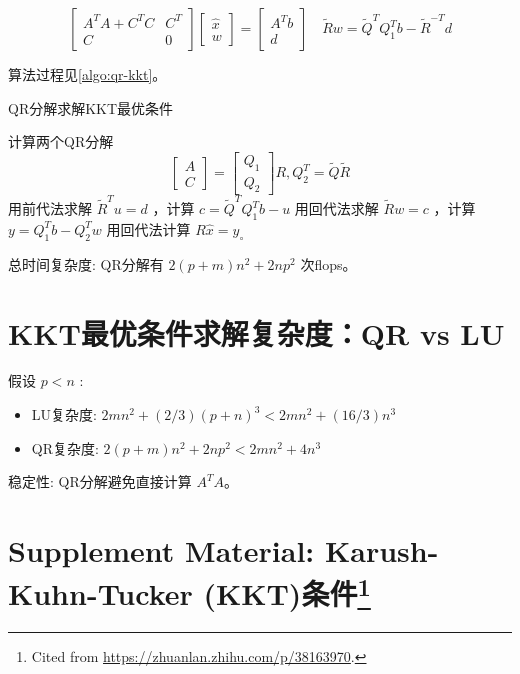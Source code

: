 $$ \left[\begin{array}{cc}A^{T} A+C^{T} C & C^{T} \\ C & 0\end{array}\right]\left[\begin{array}{c}\hat{x} \\ w\end{array}\right]=\left[\begin{array}{c}A^{T} b \\ d\end{array}\right] \quad \tilde{R} w=\tilde{Q}^{T} Q_{1}^{T} b-\tilde{R}^{-T} d $$

算法过程见\ref{algo:qr-kkt}。

\begin{algorithm}[htbp]
    \caption{QR分解求解KKT最优条件}
    \label{algo:qr-kkt}
    计算两个QR分解
$$
\left[\begin{array}{l}
A\\
C
\end{array}\right]=\left[\begin{array}{l}
Q_{1} \\
Q_{2}
\end{array}\right] R, Q_{2}^{T}=\tilde{Q} \tilde{R}
$$\;
用前代法求解 $ \tilde{R}^{T} u=d $ ，计算 $ c=\tilde{Q}^{T} Q_{1}^{T} b-u $\;
用回代法求解 $ \tilde{R} w=c $ ，计算 $ y=Q_{1}^{T} b-Q_{2}^{T} w $\;
用回代法计算 $ R \hat{x}=y_{\circ} $\;

\end{algorithm}

总时间复杂度: QR分解有 $ 2(p+m) n^{2}+2 n p^{2} $ 次flops。


\section{KKT最优条件求解复杂度：QR vs LU}

假设 $ p<n $ :

\begin{itemize}
    \item LU复杂度: $ 2 m n^{2}+(2 / 3)(p+n)^{3}<2 m n^{2}+(16 / 3) n^{3} $
    \item QR复杂度: $ 2(p+m) n^{2}+2 n p^{2}<2 m n^{2}+4 n^{3} $
\end{itemize}

稳定性: QR分解避免直接计算 $ A^{T} {A}$。

\section[Supplement Material: Karush-Kuhn-Tucker (KKT)条件]{Supplement Material: Karush-Kuhn-Tucker (KKT)条件\footnote{Cited from \url{https://zhuanlan.zhihu.com/p/38163970}.}}

